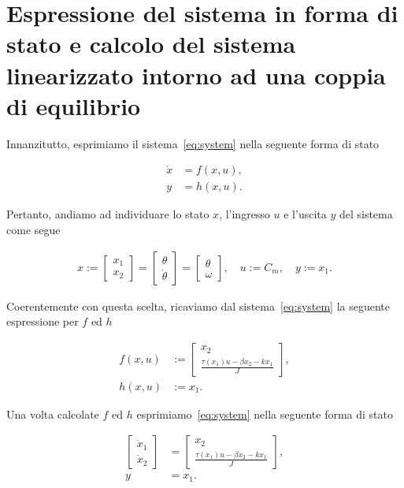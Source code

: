 \documentclass[a4paper, 11pt]{article}
\begin{document}
\newpage
\section{Espressione del sistema in forma di stato e calcolo del sistema linearizzato intorno ad una coppia di equilibrio}

Innanzitutto, esprimiamo il sistema~\eqref{eq:system} nella seguente forma di stato

\begin{subequations}
\begin{align}\label{eq:state_form}
	\dot{x} &= f(x,u),
	\\
	y &= h(x,u).
\end{align}
\end{subequations}

Pertanto, andiamo ad individuare lo stato $x$, l'ingresso $u$ e l'uscita $y$ del sistema come segue 

\begin{align*}
    x:=\begin{bmatrix}
        x_1 \\
        x_2
    \end{bmatrix} =
    \begin{bmatrix}
        \theta \\
        \dot{\theta}
    \end{bmatrix} =
    \begin{bmatrix}
        \theta \\
        \omega
    \end{bmatrix}, 
    \quad u := C_m, \quad y := x_1.
\end{align*}

Coerentemente con questa scelta, ricaviamo dal sistema~\eqref{eq:system} la seguente espressione per $f$ ed $h$

\begin{align*}
    f(x,u) &:= \begin{bmatrix}
        x_2 \\
        \frac{\tau(x_1)u - \beta x_2 - kx_1}{J}
    \end{bmatrix},
    \\
    h(x,u) &:= x_1.
\end{align*}

Una volta calcolate $f$ ed $h$ esprimiamo~\eqref{eq:system} nella seguente forma di stato

\begin{subequations}\label{eq:our_system_state_form}
\begin{align}
    \begin{bmatrix}
        \dot{x}_1
        \\
        \dot{x}_2
    \end{bmatrix} &= \begin{bmatrix}
        x_2 \\
        \frac{\tau(x_1)u - \beta x_2 - kx_1}{J}
    \end{bmatrix}, \label{eq:state_form_1}
    \\
    y &= x_1.
\end{align}
\end{subequations}
\end{document}
